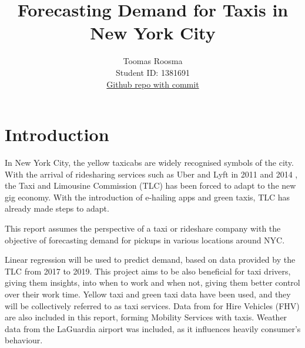 \documentclass[11pt]{article}
\title{\textbf{Forecasting Demand for Taxis in New York City}}
\author{
Toomas Roosma \\
Student ID: 1381691 \\
\href{https://github.com/MAST30034-Applied-Data-Science/mast30034-project-1-ToomasRo/commit/68eb95dd343f163fd64bdcbf79bc71494db85056}{Github repo with commit}
}
\begin{document}
\maketitle

\section{Introduction}
In  New York City, the yellow taxicabs are widely recognised symbols of the city. 
With the arrival of ridesharing services such as Uber and Lyft in 2011 \cite{uberStartDate} and 2014 \cite{lyftStartDate}, the Taxi and Limousine Commission (TLC) has been forced to adapt to the new gig economy. With the introduction of e-hailing apps and green taxis, TLC has already made steps to adapt. 

This report assumes the perspective of a taxi or rideshare company with the objective of forecasting demand for pickups in various locations around NYC.

Linear regression will be used to predict demand, based on data provided by the TLC from 2017 to 2019. This project aims to be also beneficial for taxi drivers, giving them insights, into when to work and when not, giving them better control over their work time. Yellow taxi and green taxi data have been used, and they will be collectively referred to as taxi services. Data from for Hire Vehicles (FHV) are also included in this report, forming Mobility Services with taxis. Weather data from the LaGuardia airport was included, as it influences heavily consumer's behaviour. 

\end{document}
